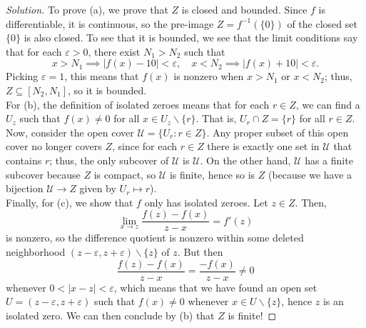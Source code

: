 \documentclass[11pt]{scrartcl}
\providecommand{\eps}{\varepsilon}
\providecommand{\inv}{^{-1}}
\providecommand{\setdiff}{\smallsetminus}
\newenvironment{soln}{\begin{proof}[Solution]}{\end{proof}}
\begin{document}
\begin{soln}
	To prove (a), we prove that $Z$ is closed and bounded.
	Since $f$ is differentiable, it is continuous, so
	the pre-image $Z = f\inv(\{0\})$ of the closed set $\{0\}$
	is also closed. To see that it is bounded, we see that the
	limit conditions say that for each $\eps > 0$,
	there exist $N_1 > N_2$ such that
	\[x > N_1\implies |f(x) - 10| < \eps,\quad
	x < N_2\implies |f(x) + 10| < \eps.\]
	Picking $\eps = 1$, this means that $f(x)$ is nonzero
	when $x > N_1$ or $x < N_2$; 
	thus, $Z\subseteq[N_2, N_1]$, so it is bounded.\\
	
	For (b), the definition of isolated zeroes means that
	for each $r\in Z$, we can find a $U_z$ such that
	$f(x)\ne 0$ for all $x\in U_z\setdiff \{r\}$.
	That is, $U_r\cap Z = \{r\}$ for all $r\in Z$.
	Now, consider the open cover $\mathcal U = \{U_r : r\in Z\}$.
	Any proper subset of this open cover
	no longer covers $Z$, since for each $r\in Z$
	there is exactly one set in $\mathcal U$ that contains $r$;
	thus, the only subcover of $\mathcal U$ is $\mathcal U$.
	On the other hand, $\mathcal U$ has a finite subcover
	because $Z$ is compact, so $\mathcal U$ is finite,
	hence so is $Z$ (because we have a bijection $\mathcal U\to Z$
	given by $U_r \mapsto r$).\\
	
	Finally, for (c), we show that $f$ only has isolated zeroes.
	Let $z\in Z$. Then,
	\[\lim_{x\to z} \frac{f(z) - f(x)}{z - x} = f'(z)\]
	is nonzero, so the difference quotient is nonzero within some
	deleted neighborhood $(z-\eps,z+\eps)\setdiff\{z\}$ of $z$. But then
	\[\frac{f(z) - f(x)}{z - x} = \frac{-f(x)}{z - x} \ne 0\]
	whenever $0 < |x - z| < \eps$, which means that we have found
	an open set $U = (z-\eps, z+\eps)$ such that
	$f(x)\ne 0$ whenever $x\in U\setdiff\{z\}$, hence $z$ is an isolated zero.
	We can then conclude by (b) that $Z$ is finite!
\end{soln}





\end{document}
